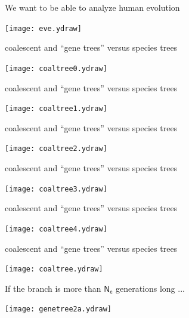 \documentclass[bluish,slideColor,colorBG,pdf]{prosper}
\begin{document}
\begin{slide}[Replace]{We want to be able to analyze human evolution}

\centerline{\texttt{[image: eve.ydraw]}}

\end{slide}

\begin{slide}[Replace]{coalescent and ``gene trees'' versus species trees}

\centerline{\texttt{[image: coaltree0.ydraw]}}

\end{slide}

\begin{slide}[Replace]{coalescent and ``gene trees'' versus species trees}

\centerline{\texttt{[image: coaltree1.ydraw]}}

\end{slide}

\begin{slide}[Replace]{coalescent and ``gene trees'' versus species trees}

\centerline{\texttt{[image: coaltree2.ydraw]}}

\end{slide}

\begin{slide}[Replace]{coalescent and ``gene trees'' versus species trees}

\centerline{\texttt{[image: coaltree3.ydraw]}}

\end{slide}

\begin{slide}[Replace]{coalescent and ``gene trees'' versus species trees}

\centerline{\texttt{[image: coaltree4.ydraw]}}

\end{slide}

\begin{slide}[Replace]{coalescent and ``gene trees'' versus species trees}

\centerline{\texttt{[image: coaltree.ydraw]}}

\end{slide}

\begin{slide}[Replace]{If the branch is more than $\mathsf{N_e}$ generations long ... }

\centerline{\texttt{[image: genetree2a.ydraw]}}

\end{slide}
\end{document}
